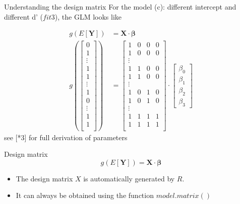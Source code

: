 \documentclass[10pt]{beamer}
\begin{document}
\begin{frame}[fragile]{Understanding the design matrix}
For the model (c): different intercept and different d' ($fit3$), the GLM looks like 

\begin{align*}
g(E[\mathbf{Y}]) &= \mathbf{X} \cdot \mathbf{\beta}\\
    g( 
    \begin{bmatrix}
           0 \\
           1 \\
           \vdots \\
           1 \\
           1 \\
           \vdots \\
           1 \\
           0 \\
           \vdots \\
           1 \\
           1 \\
    \end{bmatrix} ) &= 
    \begin{bmatrix}
           1 & 0 & 0 & 0\\
           1 & 0 & 0 & 0\\
           \vdots \\
           1 & 1 & 0 & 0\\
           1 & 1 & 0 & 0\\
           \vdots \\
           1 & 0 & 1 & 0\\
           1 & 0 & 1 & 0\\
           \vdots \\
           1 & 1 & 1 & 1\\
           1 & 1 & 1 & 1\\
    \end{bmatrix} \cdot
    \begin{bmatrix}
           \beta_0 \\
           \beta_1 \\
           \beta_2 \\
           \beta_3 
    \end{bmatrix}
\end{align*}
{\small \hfill see [*3] for full derivation of parameters}
\end{frame}


\begin{frame}{Design matrix}
$$
g(E[\mathbf{Y}]) = \mathbf{X} \cdot \mathbf{\beta}
$$

\begin{itemize}
\item The design matrix $X$ is automatically generated by $R$.
\item It can always be obtained using the function $model.matrix()$
\end{itemize}

\end{frame}
\end{document}
